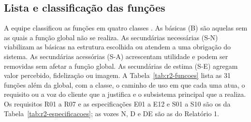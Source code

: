 \subsection{Lista e classificação das funções}
\label{sub:r2-lista-funcoes}

A equipe classificou as funções em quatro classes \cite{rozenfeld2006gestao, zancul2026conceitual}. As básicas (B) são aquelas sem as quais a função global não se realiza. As secundárias necessárias (S-N) viabilizam as básicas na estrutura escolhida ou atendem a uma obrigação do sistema. As secundárias acessórias (S-A) acrescentam utilidade e podem ser removidas sem afetar a função global. As secundárias de estima (S-E) agregam valor percebido, fidelização ou imagem. A Tabela~\ref{tab:r2-funcoes} lista as 31 funções além da global, com a classe, o caminho de uso em que cada uma atua, o requisito ou a voz do cliente que a justifica e o subsistema principal que a realiza. Os requisitos R01 a R07 e as especificações E01 a E12 e S01 a S10 são os da Tabela~\ref{tab:r2-especificacoes}; as vozes N, D e DE são as do Relatório 1.

